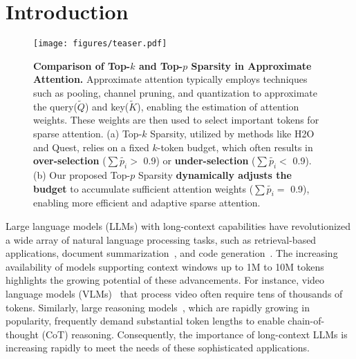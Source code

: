 \section{Introduction}
\label{submission}

\begin{figure*}
\begin{center}
\centerline{\texttt{[image: figures/teaser.pdf]}}
\caption{\textbf{Comparison of Top-$k$ and Top-$p$ Sparsity in Approximate Attention.} Approximate attention typically employs techniques such as pooling, channel pruning, and quantization to approximate the query($\tilde{Q}$) and key($\tilde{K}$), enabling the estimation of attention weights. These weights are then used to select important tokens for sparse attention. (a) Top-$k$ Sparsity, utilized by methods like H2O and Quest, relies on a fixed $k$-token budget, which often results in \textbf{over-selection} ($\sum \tilde{p_i}>$ 0.9) or \textbf{under-selection} ($\sum \tilde{p_i}<$ 0.9). (b) Our proposed Top-$p$ Sparsity \textbf{dynamically adjusts the budget} to accumulate sufficient attention weights ($\sum \tilde{p_i} = $ 0.9), enabling more efficient and adaptive sparse attention.}
\label{fig:teaser}
\end{center}
\end{figure*}


Large language models (LLMs) with long-context capabilities have revolutionized a wide array of natural language processing tasks, such as retrieval-based applications, document summarization~\cite{bai2024longbench}, and code generation~\cite{jain2024livecodebenchholisticcontaminationfree}.
The increasing availability of models supporting context windows up to 1M to 10M tokens~\cite{yang2025qwen251mtechnicalreport,geminiteam2024gemini15unlockingmultimodal} highlights the growing potential of these advancements. 
For instance, video language models (VLMs)~\cite{wang2024qwen2vlenhancingvisionlanguagemodels} that process video often require tens of thousands of tokens. 
Similarly, large reasoning models~\cite{deepseekai2025deepseekr1incentivizingreasoningcapability,kimiteam2025kimik15scalingreinforcement}, which are rapidly growing in popularity, frequently demand substantial token lengths to enable chain-of-thought (CoT) reasoning. 
Consequently, the importance of long-context LLMs is increasing rapidly to meet the needs of these sophisticated applications.

